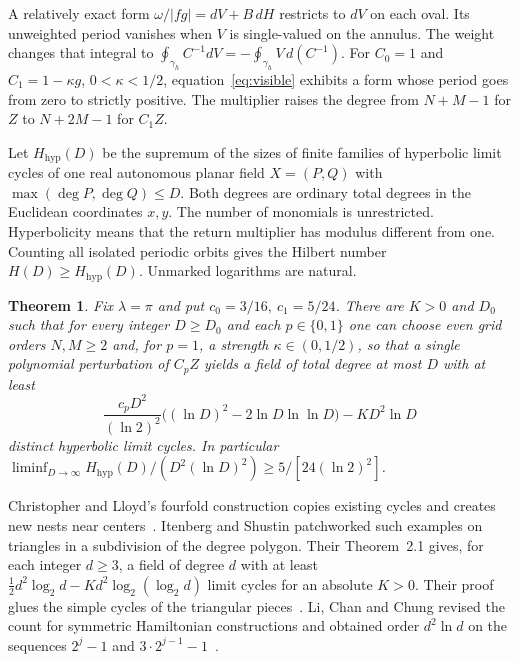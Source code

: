 \documentclass[11pt,a4paper]{amsart}
\newtheorem{theorem}{Theorem}[section]
\numberwithin{equation}{section}
\newcommand{\HH}{H_{\mathrm{hyp}}}
\begin{document}
A relatively exact form \(\omega/|fg|=dV+B\,dH\) restricts to \(dV\) on each oval. Its unweighted period vanishes when \(V\) is single-valued on the annulus. The weight changes that integral to \(\oint_{\gamma_h} C^{-1}dV=-\oint_{\gamma_h}V\,d(C^{-1})\). For \(C_0=1\) and \(C_1=1-\kappa g\), \(0<\kappa<1/2\), equation~\eqref{eq:visible} exhibits a form whose period goes from zero to strictly positive. The multiplier raises the degree from \(N+M-1\) for \(Z\) to \(N+2M-1\) for \(C_1 Z\).

Let \(\HH(D)\) be the supremum of the sizes of finite families of hyperbolic limit cycles of one real autonomous planar field \(X=(P,Q)\) with \(\max(\deg P,\deg Q)\le D\). Both degrees are ordinary total degrees in the Euclidean coordinates \(x,y\). The number of monomials is unrestricted. Hyperbolicity means that the return multiplier has modulus different from one. Counting all isolated periodic orbits gives the Hilbert number \(H(D)\ge\HH(D)\). Unmarked logarithms are natural.

\newpage
\begin{theorem}\label{th:main}
Fix \(\lambda=\pi\) and put \(c_0=3/16,\ c_1=5/24\). There are \(K>0\) and \(D_0\) such that for every integer \(D\ge D_0\) and each \(p\in\{0,1\}\) one can choose even grid orders \(N,M\ge2\) and, for \(p=1\), a strength \(\kappa\in(0,1/2)\), so that a single polynomial perturbation of \(C_pZ\) yields a field of total degree at most \(D\) with at least
\begin{equation}\label{eq:main}
 \frac{c_p D^2}{(\ln 2)^2}
       \bigl((\ln D)^2-2\ln D\ln\ln D\bigr)-K D^2\ln D
\end{equation}
distinct hyperbolic limit cycles. In particular
\(\displaystyle\liminf_{D\to\infty}\HH(D)/(D^2(\ln D)^2)\ge 5/[24(\ln 2)^2]\).
\end{theorem}

Christopher and Lloyd's fourfold construction copies existing cycles and creates new nests near centers~\cite[\S3]{christopher}. Itenberg and Shustin patchworked such examples on triangles in a subdivision of the degree polygon. Their Theorem~2.1 gives, for each integer \(d\ge3\), a field of degree \(d\) with at least \(\tfrac12 d^2\log_2 d-Kd^2\log_2(\log_2 d)\) limit cycles for an absolute \(K>0\). Their proof glues the simple cycles of the triangular pieces~\cite[Theorems 1.3.1 and 2.1, Proposition 2.2]{itenberg}. Li, Chan and Chung revised the count for symmetric Hamiltonian constructions and obtained order \(d^2\ln d\) on the sequences \(2^j-1\) and \(3\cdot2^{j-1}-1\)~\cite[\S3 and Theorem 5.2]{lichan}.
\end{document}

